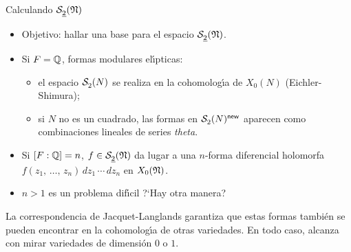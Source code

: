 \begin{frame}{Calculando $\spitzH2{\frak N}$}
	\begin{itemize}
		\item Objetivo: hallar una base para el espacio
			$\spitzH{2}{\frak{N}}$.
		\item Si $F=\bb Q$, formas modulares el\'{\i}pticas:
			\begin{itemize}
				\item el espacio $\spitz{2}{N}$
					se realiza en la cohomolog\'{\i}a de
					$X_0(N)$ (Eichler-Shimura);
				\item si $N$ no es un cuadrado, las formas en
					$\spitz{2}{N}^{\neue}$ aparecen como
					combinaciones lineales de series
					\emph{theta}.
			\end{itemize}
		\item Si $[F:\bb Q]=n$, $f\in\spitzH2{\frak N}$ da lugar a una
			$n$-forma diferencial holomorfa
			$f(z_1,\,\dots,\,z_n)\,dz_1\,\cdots\,dz_n$ en
			$X_0(\frak N)$.
		\item $n>1$ es un problema dif\'{\i}cil
			?`Hay otra manera?%
	\end{itemize}
	La correspondencia de Jacquet-Langlands garantiza que estas formas
	tambi\'{e}n se pueden encontrar en la cohomolog\'{\i}a de otras
	variedades. En todo caso, alcanza con mirar variedades de dimensi\'{o}n
	$0$ o $1$.
\end{frame}

